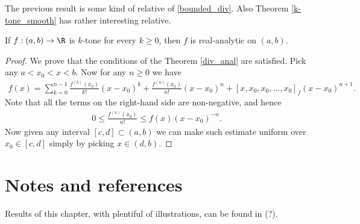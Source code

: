 The previous result is some kind of relative of \ref{bounded_div}. Also Theorem \ref{k-tone_smooth} has rather interesting relative.

\begin{lause}\label{bernstein_theorem}
	If $f : (a, b) \to \R$ is $k$-tone for every $k \geq 0$, then $f$ is real-analytic on $(a, b)$.
\end{lause}
\begin{proof}
	We prove that the conditions of the Theorem \ref{div_anal} are satisfied. Pick any $a < x_{0} < x < b$. Now for any $n \geq 0$ we have
	\begin{align*}
		f(x) = \sum_{k = 0}^{n - 1} \frac{f^{(k)}(x_{0})}{k!}(x - x_{0})^{k} + \frac{f^{(n)}(x_{0})}{n!} (x - x_{0})^{n} + [x, x_{0}, x_{0}, \ldots, x_{0}]_{f} (x - x_{0})^{n + 1}.
	\end{align*}
	Note that all the terms on the right-hand side are non-negative, and hence
	\begin{align*}
		0 \leq \frac{f^{(n)}(x_{0})}{n!} \leq f(x) (x - x_{0})^{-n}.
	\end{align*}
	Now given any interval $[c, d] \subset (a, b)$ we can make such estimate uniform over $x_{0} \in [c, d]$ simply by picking $x \in (d, b)$.
\end{proof}

\section{Notes and references}
Results of this chapter, with plentiful of illustrations, can be found in \cite{Boor2} (?).

